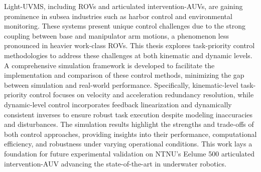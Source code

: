 Light-UVMS, including 
ROVs and articulated intervention-AUVs, 
are gaining prominence in subsea industries such as harbor control and 
environmental monitoring. These systems present unique control challenges due 
to the strong coupling between base and manipulator arm motions, a phenomenon 
less pronounced in heavier work-class ROVs. This thesis explores task-priority 
control methodologies to address these challenges at both kinematic and dynamic 
levels. A comprehensive simulation framework is developed to facilitate the 
implementation and comparison of these control methods, minimizing the gap 
between simulation and real-world performance. Specifically, kinematic-level 
task-priority control focuses on velocity and acceleration redundancy 
resolution, while dynamic-level control incorporates feedback linearization and 
dynamically consistent inverses to ensure robust task execution 
despite modeling inaccuracies and disturbances. The simulation results 
highlight the strengths  and trade-offs of both control approaches, providing 
insights into their performance, computational efficiency, and robustness under 
varying operational conditions. This work lays a foundation for future 
experimental validation on NTNU’s Eelume 500 articulated intervention-AUV 
advancing the state-of-the-art in underwater robotics.
